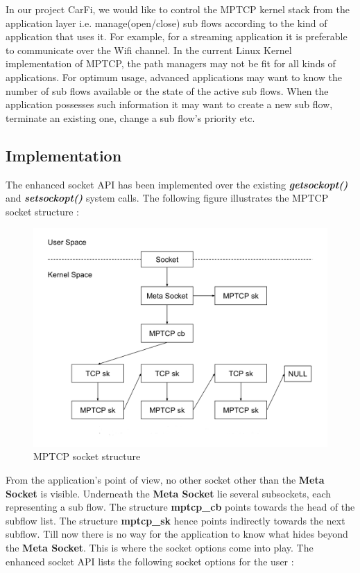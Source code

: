 \documentclass[a4paper,11pt]{article}
\begin{document}
		\label{sec:mptcpapi}
		 In our project CarFi, we would like to control the MPTCP kernel stack from the application layer i.e. manage(open/close) sub flows according to the kind of application that uses it. For example, for a streaming application it is preferable to communicate over the Wifi channel. In the current Linux Kernel implementation of MPTCP, the path managers may not be fit for all kinds of applications. For optimum usage, advanced applications may want to know the number of sub flows available or the state of the active sub flows. When the application possesses such information it may want to create a new sub flow, terminate an existing one, change a sub flow's priority etc.

		\subsection{Implementation}
			\label{subsec:implement}
			The enhanced socket API has been implemented over the existing \textbf{\emph{getsockopt()}} and \textbf{\emph{setsockopt()}} system calls. The following figure illustrates the MPTCP socket structure \cite{api}:
			\begin{figure}[h]
			\begin{center}
				\includegraphics[scale=1.5]{pictures/mptcp_socket_structure.jpg}
				\caption[]{MPTCP socket structure}
			\end{center}
			\end{figure}

			From the application's point of view, no other socket other than the \textbf{Meta Socket} is visible. Underneath the \textbf{Meta Socket} lie several subsockets, each representing a sub flow. The structure \textbf{mptcp\_cb} points towards the head of the subflow list. The structure \textbf{mptcp\_sk} hence points indirectly towards the next subflow.
			Till now there is no way for the application to know what hides beyond the \textbf{Meta Socket}. This is where the socket options come into play. The enhanced socket API lists the following socket options for the user \cite{api}:
\end{document}
